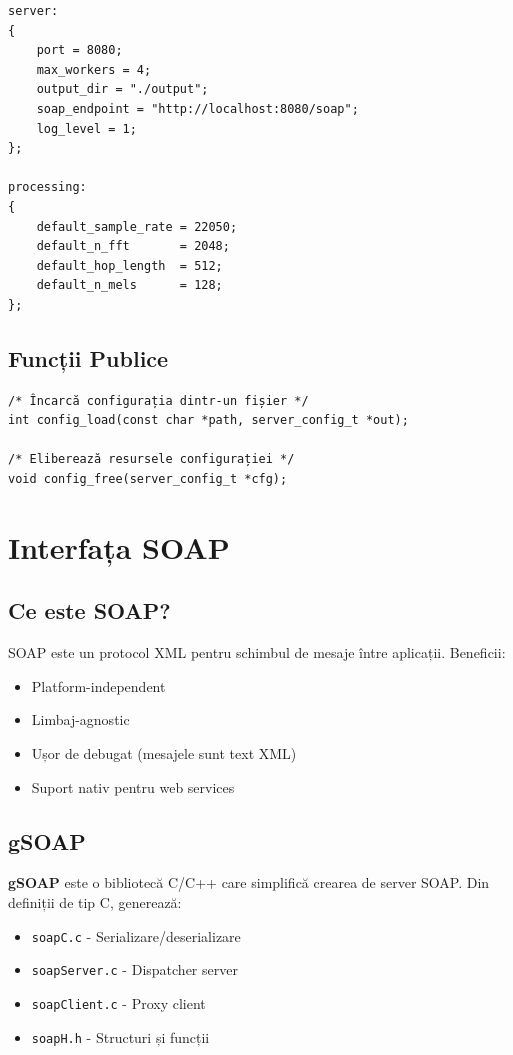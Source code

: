 \documentclass[12pt,a4paper,oneside]{book}
\newcommand{\conceptbox}[2]{
\begin{tcolorbox}[colback=lightblue,colframe=darkblue,title=#1]
#2
\end{tcolorbox}
}
\begin{document}
\begin{lstlisting}[caption=Exemplu server.cfg]
server:
{
    port = 8080;
    max_workers = 4;
    output_dir = "./output";
    soap_endpoint = "http://localhost:8080/soap";
    log_level = 1;
};

processing:
{
    default_sample_rate = 22050;
    default_n_fft       = 2048;
    default_hop_length  = 512;
    default_n_mels      = 128;
};
\end{lstlisting}

\subsection{Funcții Publice}

\begin{lstlisting}
/* Încarcă configurația dintr-un fișier */
int config_load(const char *path, server_config_t *out);

/* Eliberează resursele configurației */
void config_free(server_config_t *cfg);
\end{lstlisting}

\section{Interfața SOAP}

\subsection{Ce este SOAP?}

\conceptbox{SOAP - Simple Object Access Protocol}{
SOAP este un protocol XML pentru schimbul de mesaje între aplicații. Beneficii:
\begin{itemize}
    \item Platform-independent
    \item Limbaj-agnostic
    \item Ușor de debugat (mesajele sunt text XML)
    \item Suport nativ pentru web services
\end{itemize}
}

\subsection{gSOAP}

\textbf{gSOAP} este o bibliotecă C/C++ care simplifică crearea de server SOAP. Din definiții de tip C, generează:
\begin{itemize}
    \item \texttt{soapC.c} - Serializare/deserializare
    \item \texttt{soapServer.c} - Dispatcher server
    \item \texttt{soapClient.c} - Proxy client
    \item \texttt{soapH.h} - Structuri și funcții
\end{itemize}
\end{document}
